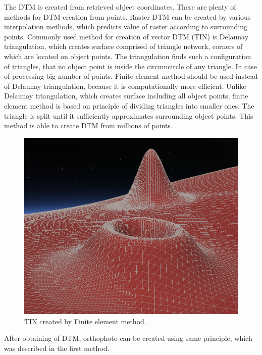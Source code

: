 \documentclass[a4paper,12pt]{article}
\begin{document}
The DTM is created from retrieved object coordinates. There 
are plenty of methods for DTM creation from points. Raster DTM can be created by various interpolation methods, 
which predicts value of raster according to surrounding points. Commonly used method for  creation of 
vector DTM (TIN) is Delaunay triangulation, which creates surface comprised of triangle network, corners of which are located 
on object points. The triangulation finds such a configuration of triangles, that no object 
point is inside the circumcircle of any triangle.
In case of processing big number of points. Finite element method 
should be used instead of Delaunay triangulation, because it is computationally more efficient.
Unlike Delaunay triangulation, which creates surface including all object points, finite element method
is based on principle of dividing triangles into smaller ones. 
The triangle is split until it sufficiently approximates surrounding object points. 
This method is able to create DTM from millions of points.

\begin{figure}[h]
    \centering
    \includegraphics[scale=0.2]{figures/finite_elements.png}
    \caption{TIN created by Finite element method.}
    \label{fig:rel_or_amb}
\end{figure}

After obtaining of DTM, orthophoto can be created using same principle, which was described in the first method. 

\end{document}
